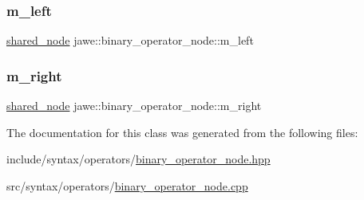 \subsubsection{\texorpdfstring{m\+\_\+left}{m\_left}}
{\footnotesize\ttfamily \hyperlink{namespacejawe_a3f307481d921b6cbb50cc8511fc2b544}{shared\+\_\+node} jawe\+::binary\+\_\+operator\+\_\+node\+::m\+\_\+left\hspace{0.3cm}{\ttfamily [private]}}

\mbox{\label{classjawe_1_1binary__operator__node_add4099a75e39ab3931d71b3d6e1032c8}} 
\subsubsection{\texorpdfstring{m\+\_\+right}{m\_right}}
{\footnotesize\ttfamily \hyperlink{namespacejawe_a3f307481d921b6cbb50cc8511fc2b544}{shared\+\_\+node} jawe\+::binary\+\_\+operator\+\_\+node\+::m\+\_\+right\hspace{0.3cm}{\ttfamily [private]}}



The documentation for this class was generated from the following files\+:\begin{DoxyCompactItemize}
\item 
include/syntax/operators/\hyperlink{binary__operator__node_8hpp}{binary\+\_\+operator\+\_\+node.\+hpp}\item 
src/syntax/operators/\hyperlink{binary__operator__node_8cpp}{binary\+\_\+operator\+\_\+node.\+cpp}\end{DoxyCompactItemize}
